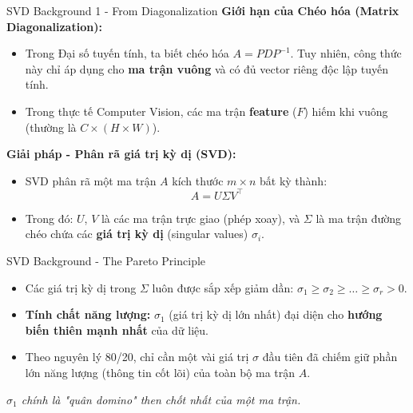 \documentclass[aspectratio=169, 10pt]{beamer}
\begin{document}
	\begin{frame}{SVD Background 1 - From Diagonalization}
		\textbf{Giới hạn của Chéo hóa (Matrix Diagonalization):}
		\begin{itemize}
			\item Trong Đại số tuyến tính, ta biết chéo hóa $A = PDP^{-1}$. Tuy nhiên, công thức này chỉ áp dụng cho \textbf{ma trận vuông} và có đủ vector riêng độc lập tuyến tính.
			\item Trong thực tế Computer Vision, các ma trận \textbf{feature} ($F$) hiếm khi vuông (thường là $C \times (H \times W)$).
		\end{itemize}
		\vspace{0.3cm}
		\textbf{Giải pháp - Phân rã giá trị kỳ dị (SVD):}
		\begin{itemize}
			\item SVD phân rã một ma trận $A$ kích thước $m \times n$ bất kỳ thành: 
			\begin{equation*}
				A = U \Sigma V^\top
			\end{equation*}
			\item Trong đó: $U$, $V$ là các ma trận trực giao (phép xoay), và $\Sigma$ là ma trận đường chéo chứa các \textbf{giá trị kỳ dị} (singular values) $\sigma_i$.
		\end{itemize}
	\end{frame}
	
	\begin{frame}{SVD Background - The Pareto Principle}
		\begin{itemize}
			\item Các giá trị kỳ dị trong $\Sigma$ luôn được sắp xếp giảm dần: $\sigma_1 \ge \sigma_2 \ge \dots \ge \sigma_r > 0$.
			\item \textbf{Tính chất năng lượng:} $\sigma_1$ (giá trị kỳ dị lớn nhất) đại diện cho \textbf{hướng biến thiên mạnh nhất} của dữ liệu.
			\item Theo nguyên lý 80/20, chỉ cần một vài giá trị $\sigma$ đầu tiên đã chiếm giữ phần lớn năng lượng (thông tin cốt lõi) của toàn bộ ma trận $A$.
		\end{itemize}
		\vspace{0.3cm}
		\begin{center}
			\textit{$\sigma_1$ chính là "quân domino" then chốt nhất của một ma trận.}
		\end{center}
	\end{frame}
	
\end{document}
